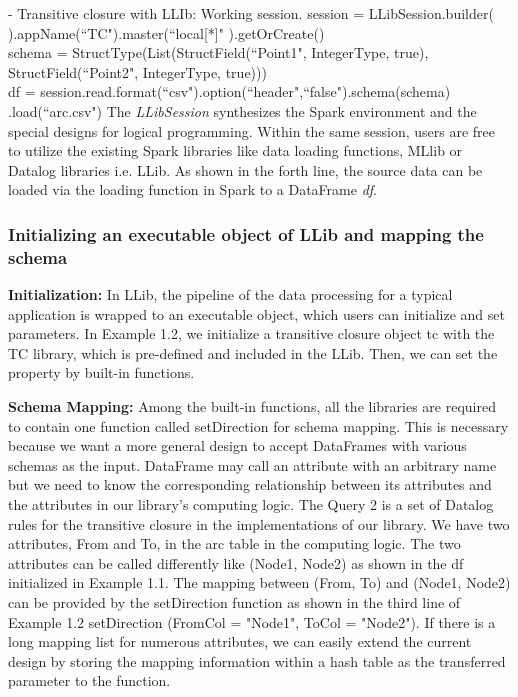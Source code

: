 \vspace{0.5em}
 - Transitive closure with LLIb:  Working session.
\bldl
session = LLibSession.builder(
).appName(``TC").master(``local[*]"
).getOrCreate()\\

schema = StructType(List(StructField(``Point1", IntegerType, true),\\
StructField(``Point2", IntegerType, true)))\\

df = session.read.format(``csv").option(``header",``false").schema(schema)
.load(``arc.csv")
\eldl
The \textit{LLibSession} synthesizes the  Spark environment and the special designs for logical programming. Within the same session, users are free to utilize the existing Spark libraries like data loading functions, MLlib  or Datalog libraries i.e. LLib. As shown in the forth line, the source data can be loaded via the loading function in Spark to a DataFrame \textit{df}. 

\subsubsection{Initializing an executable object of LLib and  mapping the schema}
\textbf{Initialization: }In LLib, the pipeline of the data processing for a typical application is wrapped to an executable object, which users can initialize and set parameters. In Example 1.2, we initialize a transitive closure object tc with the TC library, which is pre-defined and included in the LLib. 
Then, we can set the property by built-in functions. 


\textbf{Schema Mapping: }Among the built-in functions,  all the libraries are required to contain one function called setDirection for schema mapping. This is necessary because we want a more general design to accept   DataFrames with various schemas as the input.  DataFrame may call an attribute with an arbitrary name but we need to know the corresponding relationship between its attributes and the attributes in our library's computing logic. The Query 2 is a set of Datalog rules for the transitive closure in the implementations of our library. We have two attributes,  From and To, in the arc table in the computing logic. The two attributes can be called differently like (Node1, Node2) as shown in the df initialized in Example 1.1. The mapping between (From, To) and (Node1, Node2) can be provided by the setDirection function as shown in the third line of Example 1.2 setDirection (FromCol = "Node1", ToCol = "Node2"). If there is a long mapping list for numerous attributes, we can easily extend the current design by  storing the mapping information within a hash table as the transferred parameter to the function.

